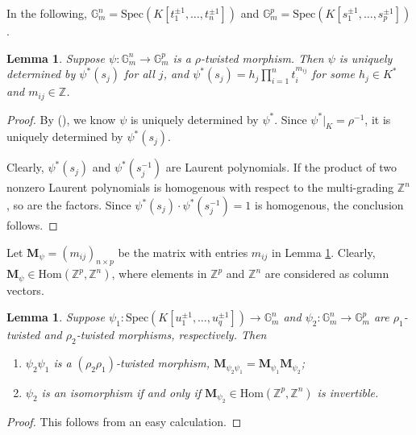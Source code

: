 \documentclass[12pt]{amsart}
\theoremstyle{plain}
\newtheorem{lemma}[theorem]{Lemma}
\theoremstyle{definition}
\theoremstyle{question}
\theoremstyle{remark}
\theoremstyle{assumption}
\numberwithin{equation}{section}
\theoremstyle{bigthm}
\begin{document}
In the following, $\mathbb{G}_{m}^{n} = \mathrm{Spec}(K[t_{1}^{\pm 1}, \dots, t_{n}^{\pm 1}])$ and $\mathbb{G}_{m}^{p} = \mathrm{Spec}(K[s_{1}^{\pm 1}, \dots, s_{p}^{\pm 1}])$.
\begin{lemma}\label{lem_morphism}
Suppose $\psi \colon  \mathbb{G}_{m}^{n} \rightarrow \mathbb{G}_{m}^{p}$ is a $\rho$-twisted morphism. Then $\psi$ is uniquely determined by $\psi^{*} (s_{j})$ for all $j$, and $\psi^{*} (s_{j}) = h_{j} \prod_{i=1}^{n} t_{i}^{m_{ij}}$ for some $h_{j} \in K^{*}$ and $m_{ij} \in \mathbb{Z}$.
\end{lemma}
\begin{proof}
By (\cite[p.~79,~Theorem~1]{Mumford}), we know $\psi$ is uniquely determined by $\psi^{*}$. Since $\psi^{*}|_{K} = \rho^{-1}$, it is uniquely determined by $\psi^{*} (s_{j})$.

Clearly, $\psi^{*} (s_{j})$ and $\psi^{*} (s_{j}^{-1})$ are Laurent polynomials. If the product of two nonzero Laurent polynomials is homogenous with respect to the multi-grading $\mathbb{Z}^{n}$, so are the factors. Since $\psi^{*} (s_{j}) \cdot \psi^{*} (s_{j}^{-1}) =1$ is homogenous, the conclusion follows.
\end{proof}

Let $\mathbf{M}_{\psi} = (m_{ij})_{n \times p}$ be the matrix with entries $m_{ij}$ in Lemma \ref{lem_morphism}. Clearly, $\mathbf{M}_{\psi} \in \mathrm{Hom} (\mathbb{Z}^{p}, \mathbb{Z}^{n})$, where elements in $\mathbb{Z}^{p}$ and $\mathbb{Z}^{n}$ are considered as column vectors.

\begin{lemma}\label{lem_matrix_morphism}
Suppose $\psi_{1} \colon  \mathrm{Spec}(K[u_{1}^{\pm 1}, \dots, u_{q}^{\pm 1}]) \rightarrow \mathbb{G}_{m}^{n}$ and $\psi_{2} \colon  \mathbb{G}_{m}^{n} \rightarrow \mathbb{G}_{m}^{p}$ are $\rho_{1}$-twisted and $\rho_{2}$-twisted morphisms, respectively. Then
\begin{enumerate}
\item $\psi_{2} \psi_{1}$ is a $(\rho_{2} \rho_{1})$-twisted morphism, $\mathbf{M}_{\psi_{2} \psi_{1}} = \mathbf{M}_{\psi_{1}} \mathbf{M}_{\psi_{2}}$;

\item $\psi_{2}$ is an isomorphism if and only if $\mathbf{M}_{\psi_{2}} \in \mathrm{Hom} (\mathbb{Z}^{p}, \mathbb{Z}^{n})$ is invertible.
\end{enumerate}
\end{lemma}
\begin{proof}
This follows from an easy calculation.
\end{proof}
\end{document}
